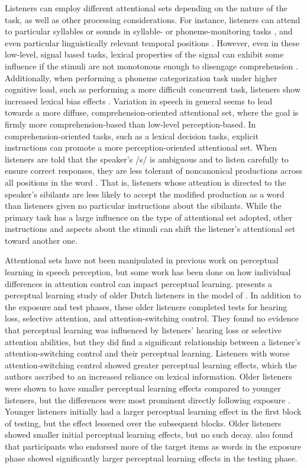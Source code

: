 Listeners can employ different attentional sets depending on the nature of the task, as well as other processing considerations.
For instance, listeners can attend to particular syllables or sounds in syllable- or phoneme-monitoring tasks \citep[and others]{Norris1988}, and even particular linguistically relevant temporal positions \citep{Pitt1990}.
However, even in these low-level, signal based tasks, lexical properties of the signal can exhibit some influence if the stimuli are not monotonous enough to disengage comprehension \citep{Cutler1987}.  
Additionally, when performing a phoneme categorization task under higher cognitive load, such as performing a more difficult concurrent task, listeners show increased lexical bias effects \citep{Mattys2011}.
Variation in speech in general seems to lead towards a more diffuse, comprehension-oriented attentional set, where the goal is firmly more comprehension-based than low-level perception-based.
In comprehension-oriented tasks, such as a lexical decision tasks, explicit instructions can promote a more perception-oriented attentional set.
When listeners are told that the speaker's /s/ is ambiguous and to listen carefully to ensure correct responses, they are less tolerant of noncanonical productions across all positions in the word \citep{Pitt2012}.  
That is, listeners whose attention is directed to the speaker's sibilants are less likely to accept the modified production as a word than listeners given no particular instructions about the sibilants.
While the primary task has a large influence on the type of attentional set adopted, other instructions and aspects about the stimuli can shift the listener's attentional set toward another one.

Attentional sets have not been manipulated in previous work on perceptual learning in speech perception, but some work has been done on how individual differences in attention control can impact perceptual learning.
\citet{Scharenborg2014} presents a perceptual learning study of older Dutch listeners in the model of \citet{Norris2003}.  
In addition to the exposure and test phases, these older listeners completed tests for hearing loss, selective attention, and attention-switching control.  
They found no evidence that perceptual learning was influenced by listeners' hearing loss or selective attention abilities, but they did find a significant relationship between a listener's attention-switching control and their perceptual learning.  
Listeners with worse attention-switching control showed greater perceptual learning effects, which the authors ascribed to an increased reliance on lexical information.  
Older listeners were shown to have smaller perceptual learning effects compared to younger listeners, but the differences were most prominent directly following exposure \citep{Scharenborg2013}.  
Younger listeners initially had a larger perceptual learning effect in the first block of testing, but the effect lessened over the subsequent blocks.  
Older listeners showed smaller initial perceptual learning effects, but no such decay.  
\citet{Scharenborg2013} also found that participants who endorsed more of the target items as words in the exposure phase showed significantly larger perceptual learning effects in the testing phase.

